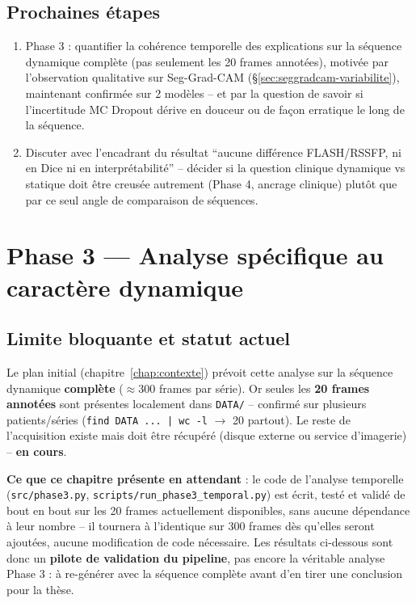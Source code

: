 \documentclass[11pt,a4paper]{report}
\begin{document}
\section{Prochaines étapes}

\begin{enumerate}[nosep]
    \item Phase 3 : quantifier la cohérence temporelle des explications sur la
        séquence dynamique complète (pas seulement les 20 frames annotées), motivée
        par l'observation qualitative sur Seg-Grad-CAM
        (\S\ref{sec:seggradcam-variabilite}), maintenant confirmée sur 2 modèles --
        et par la question de savoir si l'incertitude MC Dropout dérive en douceur
        ou de façon erratique le long de la séquence.
    \item Discuter avec l'encadrant du résultat ``aucune différence FLASH/RSSFP,
        ni en Dice ni en interprétabilité'' -- décider si la question clinique
        dynamique vs statique doit être creusée autrement (Phase 4, ancrage
        clinique) plutôt que par ce seul angle de comparaison de séquences.
\end{enumerate}

\chapter{Phase 3 --- Analyse spécifique au caractère dynamique}
\label{chap:phase3}

\section{Limite bloquante et statut actuel}
\label{sec:phase3-limite}

Le plan initial (chapitre~\ref{chap:contexte}) prévoit cette analyse sur la
séquence dynamique \textbf{complète} ($\approx$300 frames par série). Or seules les
\textbf{20 frames annotées} sont présentes localement dans \texttt{DATA/} --
confirmé sur plusieurs patients/séries (\texttt{find DATA ... | wc -l} $\to$ 20
partout). Le reste de l'acquisition existe mais doit être récupéré (disque externe
ou service d'imagerie) -- \textbf{en cours}.

\textbf{Ce que ce chapitre présente en attendant} : le code de l'analyse temporelle
(\texttt{src/phase3.py}, \texttt{scripts/run\_phase3\_temporal.py}) est écrit, testé
et validé de bout en bout sur les 20 frames actuellement disponibles, sans aucune
dépendance à leur nombre -- il tournera à l'identique sur 300 frames dès qu'elles
seront ajoutées, aucune modification de code nécessaire. Les résultats ci-dessous
sont donc un \textbf{pilote de validation du pipeline}, pas encore la véritable
analyse Phase 3 : à re-générer avec la séquence complète avant d'en tirer une
conclusion pour la thèse.
\end{document}

